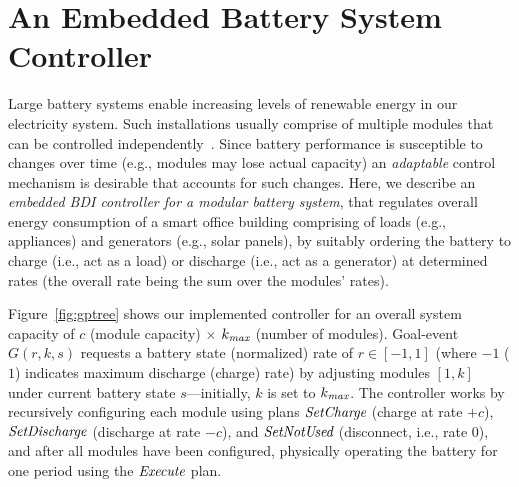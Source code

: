 \section{An Embedded Battery System Controller}\label{sec:application}

\newcommand{\mmax}{\mathname{max}}

Large battery systems enable increasing levels of renewable energy in our electricity system. 
%
Such installations usually comprise of multiple modules that can be controlled independently~\cite{norris02:grid}. 
Since battery performance is susceptible to changes over time (e.g., modules may lose actual capacity) an \emph{adaptable} control mechanism is desirable that accounts for such changes.
%
Here, we describe an {\em embedded BDI controller for a modular battery system}, that regulates overall energy consumption of a smart office building comprising of loads (e.g., appliances) and generators (e.g., solar panels), by suitably ordering the battery to charge (i.e., act as a load) or discharge (i.e., act as a generator) at determined rates (the overall rate being the sum over the modules' rates).

Figure~\ref{fig:gptree} shows our implemented controller for an overall system capacity of $c$ (module capacity) $\times$ $k_{\mmax}$ (number of modules). Goal-event $G(r,k,s)$ requests a battery state (normalized) rate of $r \in [-1,1]$ (where $-1$ ($1$) indicates maximum discharge (charge) rate) by adjusting modules $[1,k]$ under current battery state $s$---initially, $k$ is set to $k_{\mmax}$. 
The controller works by recursively configuring each module using plans $\operatorname{\textit{SetCharge}}$ (charge at rate $+c$), $\operatorname{\textit{SetDischarge}}$ (discharge at rate $-c$), and $\operatorname{\textit{SetNotUsed}}$ (disconnect, i.e., rate $0$), and after all modules have been configured, physically operating the battery for one period using the $\operatorname{\textit{Execute}}$ plan. 

